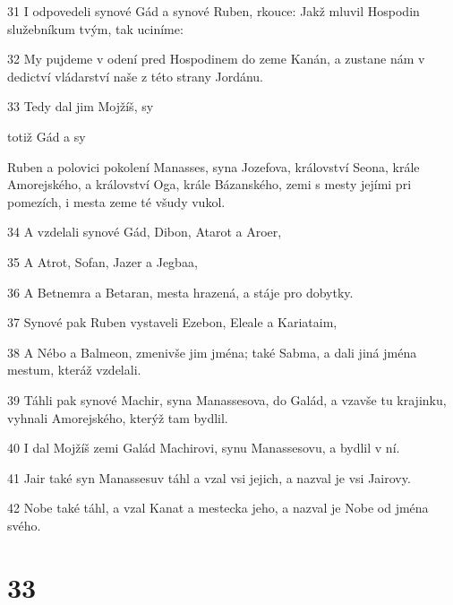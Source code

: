 \par 31 I odpovedeli synové Gád a synové Ruben, rkouce: Jakž mluvil Hospodin služebníkum tvým, tak uciníme:
\par 32 My pujdeme v odení pred Hospodinem do zeme Kanán, a zustane nám v dedictví vládarství naše z této strany Jordánu.
\par 33 Tedy dal jim Mojžíš, sy\par totiž Gád a sy\par Ruben a polovici pokolení Manasses, syna Jozefova, království Seona, krále Amorejského, a království Oga, krále Bázanského, zemi s mesty jejími pri pomezích, i mesta zeme té všudy vukol.
\par 34 A vzdelali synové Gád, Dibon, Atarot a Aroer,
\par 35 A Atrot, Sofan, Jazer a Jegbaa,
\par 36 A Betnemra a Betaran, mesta hrazená, a stáje pro dobytky.
\par 37 Synové pak Ruben vystaveli Ezebon, Eleale a Kariataim,
\par 38 A Nébo a Balmeon, zmenivše jim jména; také Sabma, a dali jiná jména mestum, kteráž vzdelali.
\par 39 Táhli pak synové Machir, syna Manassesova, do Galád, a vzavše tu krajinku, vyhnali Amorejského, kterýž tam bydlil.
\par 40 I dal Mojžíš zemi Galád Machirovi, synu Manassesovu, a bydlil v ní.
\par 41 Jair také syn Manassesuv táhl a vzal vsi jejich, a nazval je vsi Jairovy.
\par 42 Nobe také táhl, a vzal Kanat a mestecka jeho, a nazval je Nobe od jména svého.

\chapter{33}

